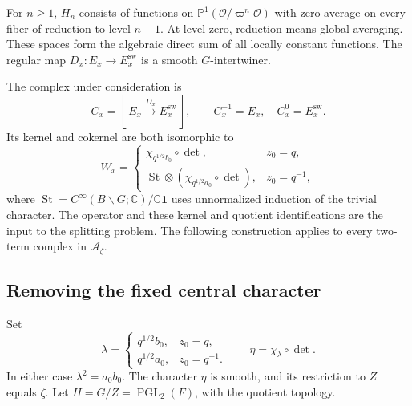For $n\ge1$, $H_n$ consists of functions on
$\mathbb P^1(\mathcal O/\varpi^n\mathcal O)$ with zero average on every fiber of reduction to level $n-1$.
At level zero, reduction means global averaging.
These spaces form the algebraic direct sum of all locally constant functions.
The regular map $D_x:E_x\to E_x^{\mathrm{sw}}$ is a smooth $G$-intertwiner.

The complex under consideration is
\begin{equation}\label{v4-arith:ic:w10-d:fixed-center:eq:cone}
 C_x=[\,E_x\xrightarrow{D_x}E_x^{\mathrm{sw}}\,],
 \qquad C_x^{-1}=E_x,\quad C_x^0=E_x^{\mathrm{sw}}.
\end{equation}
Its kernel and cokernel are both isomorphic to
\begin{equation}\label{v4-arith:ic:w10-d:fixed-center:eq:W}
 W_x=\begin{cases}
 \chi_{q^{1/2}b_0}\circ\det,&z_0=q,\\
 \operatorname{St}\otimes(\chi_{q^{1/2}a_0}\circ\det),&z_0=q^{-1},
 \end{cases}
\end{equation}
where $\operatorname{St}=C^\infty(B\backslash G;\mathbb C)/\mathbb C\mathbf1$ uses unnormalized induction of the trivial character.
The operator and these kernel and quotient identifications are the input to the splitting problem.
The following construction applies to every two-term complex in $\mathcal A_\zeta$.

\subsection{Removing the fixed central character}

Set
\[
 \lambda=\begin{cases}q^{1/2}b_0,&z_0=q,\\q^{1/2}a_0,&z_0=q^{-1}.
 \end{cases}
 \qquad \eta=\chi_\lambda\circ\det.
\]
In either case $\lambda^2=a_0b_0$.
The character $\eta$ is smooth, and its restriction to $Z$ equals $\zeta$.
Let $H=G/Z=\operatorname{PGL}_2(F)$, with the quotient topology.

